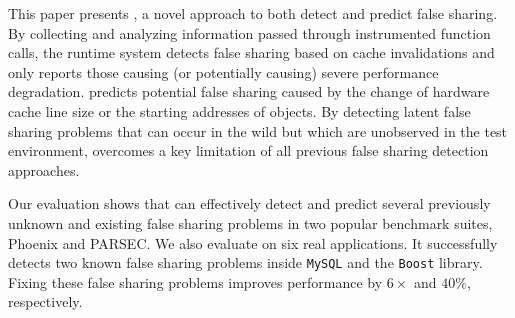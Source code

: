 \label{sec:conclusion}
This paper presents \Predator{}, a novel approach to both detect and predict false sharing. By collecting and analyzing information passed through instrumented function calls, the runtime system detects false sharing based on cache invalidations and only reports those  causing (or potentially causing) severe performance degradation.
\Predator{} predicts potential false sharing caused by the change of hardware cache line size or the starting addresses of objects. By detecting latent false sharing problems that can occur in the wild but which are unobserved in the test environment, \Predator{} overcomes a key limitation of
all previous false sharing detection approaches.

Our evaluation shows that \Predator{} can effectively detect and predict several previously unknown and existing false sharing problems in two popular benchmark suites, Phoenix and PARSEC. We also evaluate \Predator{} on six real applications. 
It successfully detects two known false sharing problems inside \texttt{MySQL} and the \texttt{Boost} library.
Fixing these false sharing problems improves performance by $6\times$ and $40\%$, respectively.

